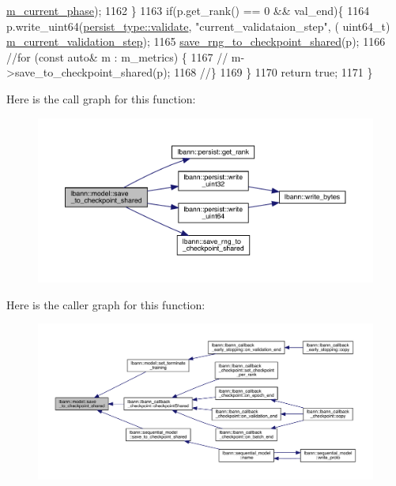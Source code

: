 \begin{DoxyCode}
      \hyperlink{classlbann_1_1model_a150ef033f81982936e007b10c421f488}{m\_current\_phase});
1162   \}
1163   \textcolor{keywordflow}{if}(p.get\_rank() == 0 && val\_end)\{
1164     p.write\_uint64(\hyperlink{namespacelbann_adee41f31f15f3906cbdcce4a1417eb56af9ab05454998236921a6b0e281fae632}{persist\_type::validate}, \textcolor{stringliteral}{"current\_validataion\_step"},       (
      uint64\_t) \hyperlink{classlbann_1_1model_af69e5f6bf49a4990fd4c18984705ab87}{m\_current\_validation\_step});
1165     \hyperlink{namespacelbann_af68acf5b249e5360289d4c6a7bfa8985}{save\_rng\_to\_checkpoint\_shared}(p);
1166     \textcolor{comment}{//for (const auto& m : m\_metrics) \{}
1167     \textcolor{comment}{//  m->save\_to\_checkpoint\_shared(p);}
1168     \textcolor{comment}{//\}}
1169   \}
1170   \textcolor{keywordflow}{return} \textcolor{keyword}{true};
1171 \}
\end{DoxyCode}
Here is the call graph for this function\+:\nopagebreak
\begin{figure}[H]
\begin{center}
\leavevmode
\includegraphics[width=350pt]{classlbann_1_1model_a3d589d2e46ad35d0a1221e25bef70fa4_cgraph}
\end{center}
\end{figure}
Here is the caller graph for this function\+:\nopagebreak
\begin{figure}[H]
\begin{center}
\leavevmode
\includegraphics[width=350pt]{classlbann_1_1model_a3d589d2e46ad35d0a1221e25bef70fa4_icgraph}
\end{center}
\end{figure}
\mbox{\label{classlbann_1_1model_a4f3cc91f8495870723389be15f77184a}} 
